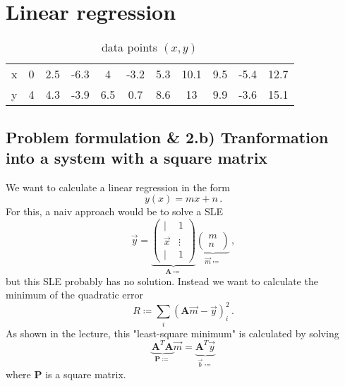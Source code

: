 \section{Linear regression}

\begin{table}[h]
    \centering
    \caption{data points $(x,y)$}
    \label{tab:data_points}
    \begin{tabular}{c c c c c c c c c c c}
        \toprule
        x & 0 & 2.5 & -6.3 & 4 & -3.2 & 5.3 & 10.1 & 9.5 & -5.4 & 12.7 \\
        y & 4 & 4.3 & -3.9 & 6.5 & 0.7 & 8.6 & 13 & 9.9 & -3.6 & 15.1 \\
        \bottomrule
    \end{tabular}
\end{table}

\subsection{Problem formulation \& 2.b) Tranformation into a system with a square matrix}

We want to calculate a linear regression in the form 
\begin{equation}
    y(x) = m x + n \, .
\end{equation} 
For this, a naiv approach would be to solve a SLE
\begin{equation}
    \vec{y} = 
    \underbrace{
        \begin{pmatrix}
            | & 1 \\
            \vec{x} & \vdots \\
            | & 1
        \end{pmatrix}
    }_{\symbf{A} \coloneqq}
    \underbrace{
        \begin{pmatrix}
            m \\
            n
        \end{pmatrix}
    }_{\vec{m} \coloneqq} \, ,
\end{equation}
but this SLE probably has no solution. 
Instead we want to calculate the minimum of the quadratic error
\begin{equation}
    R \coloneqq \sum_i (\symbf{A} \vec{m} - \vec{y})_i^2 \, .
\end{equation}
As shown in the lecture, this "least-square minimum" is calculated by solving
\begin{equation}
    \label{eq:system}
    \underbrace{
        \symbf{A}^T \symbf{A}
    }_{\symbf{P} \coloneqq}
    \vec{m} = 
    \underbrace{
        \symbf{A}^T \vec{y}
    }_{\vec{b} \coloneqq}
\end{equation}
where $\symbf{P}$ is a square matrix.

